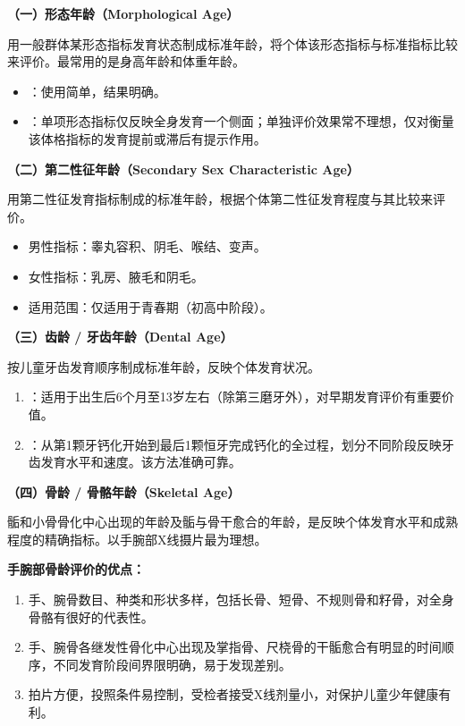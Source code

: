 \begin{keybox}
\textbf{（一）形态年龄（Morphological Age）}

用一般群体某形态指标发育状态制成标准年龄，将个体该形态指标与标准指标比较来评价。最常用的是身高年龄和体重年龄。

\begin{itemize}[leftmargin=*]
    \item {}：使用简单，结果明确。
    \item {}：单项形态指标仅反映全身发育一个侧面；单独评价效果常不理想，仅对衡量该体格指标的发育提前或滞后有提示作用。
\end{itemize}

\textbf{（二）第二性征年龄（Secondary Sex Characteristic Age）}

用第二性征发育指标制成的标准年龄，根据个体第二性征发育程度与其比较来评价。

\begin{itemize}[leftmargin=*]
    \item 男性指标：睾丸容积、阴毛、喉结、变声。
    \item 女性指标：乳房、腋毛和阴毛。
    \item 适用范围：仅适用于青春期（初高中阶段）。
\end{itemize}

\textbf{（三）齿龄 / 牙齿年龄（Dental Age）}

按儿童牙齿发育顺序制成标准年龄，反映个体发育状况。

\begin{enumerate}[leftmargin=*]
    \item {}：适用于出生后6个月至13岁左右（除第三磨牙外），对早期发育评价有重要价值。
    \item {}：从第1颗牙钙化开始到最后1颗恒牙完成钙化的全过程，划分不同阶段反映牙齿发育水平和速度。该方法准确可靠。
\end{enumerate}

\textbf{（四）骨龄 / 骨骼年龄（Skeletal Age）\difficulty}

骺和小骨骨化中心出现的年龄及骺与骨干愈合的年龄，是反映个体发育水平和成熟程度的精确指标。以手腕部X线摄片最为理想。

\textbf{手腕部骨龄评价的优点：}

\begin{enumerate}[leftmargin=*]
    \item 手、腕骨数目、种类和形状多样，包括长骨、短骨、不规则骨和籽骨，对全身骨骼有很好的代表性。
    \item 手、腕骨各继发性骨化中心出现及掌指骨、尺桡骨的干骺愈合有明显的时间顺序，不同发育阶段间界限明确，易于发现差别。
    \item 拍片方便，投照条件易控制，受检者接受X线剂量小，对保护儿童少年健康有利。
\end{enumerate}


\end{keybox}

